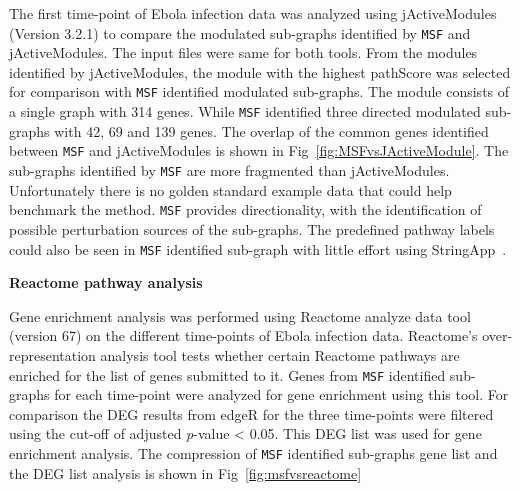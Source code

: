 \documentclass[10pt,a4paper,twocolumn]{article}
\begin{document}
	The first time-point of Ebola infection data was analyzed
        using jActiveModules (Version 3.2.1) to compare the modulated
        sub-graphs identified by \texttt{MSF} and jActiveModules. The
        input files were same for both tools. From the modules identified by jActiveModules, the module with the highest pathScore was selected for comparison with
        \texttt{MSF} identified modulated sub-graphs. The module consists of a single graph with 314
        genes. While \texttt{MSF} identified three directed modulated
        sub-graphs with 42, 69 and 139 genes. The overlap of the
        common genes identified between \texttt{MSF} and jActiveModules
        is shown in Fig~\ref{fig:MSFvsJActiveModule}. The sub-graphs identified by \texttt{MSF} are more fragmented than jActiveModules. Unfortunately there is no golden standard example data that could help benchmark the method. \texttt{MSF} provides directionality,
        with the identification of possible perturbation sources of
        the sub-graphs. The predefined pathway labels could also be seen in \texttt{MSF} identified sub-graph with little effort using StringApp~\cite{StringApp}.
        
     

	\textbf{Reactome pathway analysis}
	
	Gene enrichment analysis was performed using Reactome analyze
        data tool~\cite{Reactome} (version 67) on the different time-points of Ebola infection data. Reactome's over-representation analysis tool tests
        whether certain Reactome pathways are enriched for the list of
        genes submitted to it. Genes from \texttt{MSF} identified
        sub-graphs for each time-point were analyzed for gene
        enrichment using this tool.  For comparison the DEG results
        from edgeR for the three time-points were filtered using the
        cut-off of adjusted \textit{p}-value < 0.05. This
        DEG list was used for gene enrichment analysis. The
        compression of \texttt{MSF} identified sub-graphs gene list
        and the DEG list analysis is shown in
        Fig~\ref{fig:msfvsreactome}
	
\end{document}
